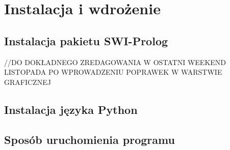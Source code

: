 \chapter{Instalacja i wdrożenie}
\thispagestyle{chapterBeginStyle}

\section{Instalacja pakietu SWI-Prolog}
//DO DOKŁADNEGO ZREDAGOWANIA W OSTATNI WEEKEND LISTOPADA PO WPROWADZENIU POPRAWEK W WARSTWIE GRAFICZNEJ
\section{Instalacja języka Python}

\section{Sposób uruchomienia programu}

